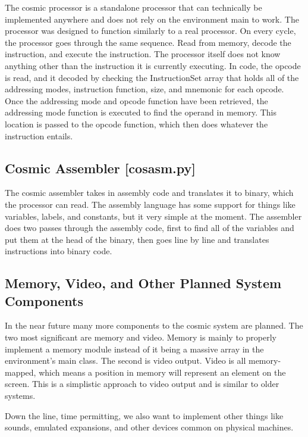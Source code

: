 \documentclass[conference]{IEEEtran}
\begin{document}
The cosmic processor is a standalone processor that can technically be implemented anywhere and does not rely on the environment main to work. The processor was designed to function similarly to a real processor. On every cycle, the processor goes through the same sequence. Read from memory, decode the instruction, and execute the instruction. The processor itself does not know anything other than the instruction it is currently executing. In code, the opcode is read, and it decoded by checking the InstructionSet array that holds all of the addressing modes, instruction function, size, and mnemonic for each opcode. Once the addressing mode and opcode function have been retrieved, the addressing mode function is executed to find the operand in memory. This location is passed to the opcode function, which then does whatever the instruction entails.


\subsection{Cosmic Assembler [cosasm.py]}

The cosmic assembler takes in assembly code and translates it to binary, which the processor can read. The assembly language has some support for things like variables, labels, and constants, but it very simple at the moment. The assembler does two passes through the assembly code, first to find all of the variables and put them at the head of the binary, then goes line by line and translates instructions into binary code.


\subsection{Memory, Video, and Other Planned System Components}
In the near future many more components to the cosmic system are planned. The two most significant are memory and video. Memory is mainly to properly implement a memory module instead of it being a massive array in the environment's main class. The second is video output. Video is all memory-mapped, which means a position in memory will represent an element on the screen. This is a simplistic approach to video output and is similar to older systems.

Down the line, time permitting, we also want to implement other things like sounds, emulated expansions, and other devices common on physical machines. 
\end{document}
